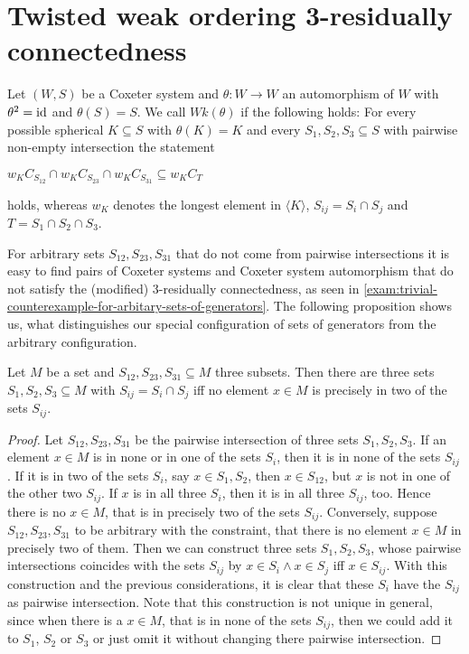\chapter{Twisted weak ordering 3-residually connectedness}
\label{sec:main-thesis}

\begin{defi}
	Let $(W,S)$ be a Coxeter system and $\theta : W \to W$ an automorphism of $W$ with $\theta^2 = \operatorname{id}$ and $\theta(S) = S$. We call $Wk(\theta)$  if the following holds: For every possible spherical $K \subseteq S$ with $\theta(K) = K$ and every $S_1,S_2,S_3 \subseteq S$ with pairwise non-empty intersection the statement
	\begin{axioms}
		 $w_K C_{S_{12}} \cap w_K C_{S_{23}} \cap w_K C_{S_{31}} \subseteq w_K C_T$
	\end{axioms}
	holds, whereas $w_K$ denotes the longest element in $\langle K \rangle$, $S_{ij} = S_i \cap S_j$ and $T = S_1 \cap S_2 \cap S_3$.
\end{defi}

For arbitrary sets $S_{12},S_{23},S_{31}$ that do not come from pairwise intersections it is easy to find pairs of Coxeter systems and Coxeter system automorphism that do not satisfy the (modified) 3-residually connectedness, as seen in \ref{exam:trivial-counterexample-for-arbitary-sets-of-generators}. The following proposition shows us, what distinguishes our special configuration of sets of generators from the arbitrary configuration.

\begin{prop}
	Let $M$ be a set and $S_{12},S_{23},S_{31} \subseteq M$ three subsets. Then there are three sets $S_1,S_2,S_3 \subseteq M$ with $S_{ij} = S_i \cap S_j$ iff no element $x \in M$ is precisely in two of the sets $S_{ij}$.

	\begin{proof}
		Let $S_{12},S_{23},S_{31}$ be the pairwise intersection of three sets $S_1,S_2,S_3$. If an element $x \in M$ is in none or in one of the sets $S_i$, then it is in none of the sets $S_{ij}$. If it is in two of the sets $S_i$, say $x \in S_1,S_2$, then $x \in S_{12}$, but $x$ is not in one of the other two $S_{ij}$. If $x$ is in all three $S_i$, then it is in all three $S_{ij}$, too. Hence there is no $x \in M$, that is in precisely two of the sets $S_{ij}$. Conversely, suppose $S_{12},S_{23},S_{31}$ to be arbitrary with the constraint, that there is no element $x \in M$ in precisely two of them. Then we can construct three sets $S_1,S_2,S_3$, whose pairwise intersections coincides with the sets $S_{ij}$ by $x \in S_i \wedge x \in S_j$ iff $x \in S_{ij}$. With this construction and the previous considerations, it is clear that these $S_i$ have the $S_{ij}$ as pairwise intersection. Note that this construction is not unique in general, since when there is a $x \in M$, that is in none of the sets $S_{ij}$, then we could add it to $S_1$, $S_2$ or $S_3$ or just omit it without changing there pairwise intersection.
	\end{proof}
\end{prop}




